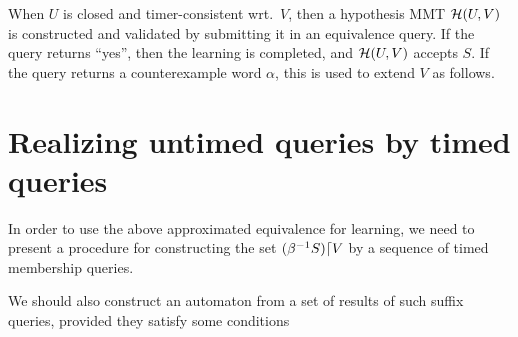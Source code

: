 When $U$ is closed and timer-consistent wrt.\ $V$, then
    a hypothesis MMT $\mathcal{H}(U,V)$ is constructed and
    validated by submitting it in an equivalence query.
    If the query returns ``yes'', then
    the learning is completed, and $\mathcal{H}(U,V)$ accepts $S$.
    If the query returns a counterexample word $\alpha$, this is used to extend
    $V$ as follows.


\section{Realizing untimed queries by timed queries}

In order to use the above approximated equivalence for learning, we need to
present a procedure for constructing the set
$({\beta}^{-1}{S})\lceil{V}$ by a sequence of timed membership queries.

We should also construct an automaton from a set of results of such
suffix queries, provided they satisfy some conditions


